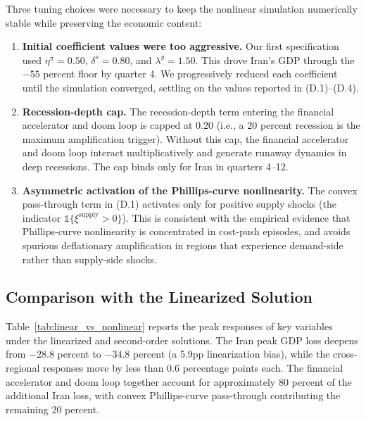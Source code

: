 \documentclass[12pt]{article}
\begin{document}
Three tuning choices were necessary to keep the nonlinear simulation numerically stable while preserving the economic content:
\begin{enumerate}[itemsep=2pt, topsep=2pt]
    \item \textbf{Initial coefficient values were too aggressive.} Our first specification used $\eta^\pi = 0.50$, $\delta^s = 0.80$, and $\lambda^y = 1.50$. This drove Iran's GDP through the $-55$ percent floor by quarter 4. We progressively reduced each coefficient until the simulation converged, settling on the values reported in (D.1)--(D.4).
    \item \textbf{Recession-depth cap.} The recession-depth term entering the financial accelerator and doom loop is capped at 0.20 (i.e., a 20 percent recession is the maximum amplification trigger). Without this cap, the financial accelerator and doom loop interact multiplicatively and generate runaway dynamics in deep recessions. The cap binds only for Iran in quarters 4--12.
    \item \textbf{Asymmetric activation of the Phillips-curve nonlinearity.} The convex pass-through term in (D.1) activates only for positive supply shocks (the indicator $\mathbb{1}\{\xi^{\text{supply}} > 0\}$). This is consistent with the empirical evidence that Phillips-curve nonlinearity is concentrated in cost-push episodes, and avoids spurious deflationary amplification in regions that experience demand-side rather than supply-side shocks.
\end{enumerate}

\subsection{Comparison with the Linearized Solution}

Table~\ref{tab:linear_vs_nonlinear} reports the peak responses of key variables under the linearized and second-order solutions. The Iran peak GDP loss deepens from $-28.8$ percent to $-34.8$ percent (a 5.9pp linearization bias), while the cross-regional responses move by less than 0.6 percentage points each. The financial accelerator and doom loop together account for approximately 80 percent of the additional Iran loss, with convex Phillips-curve pass-through contributing the remaining 20 percent.
\end{document}
